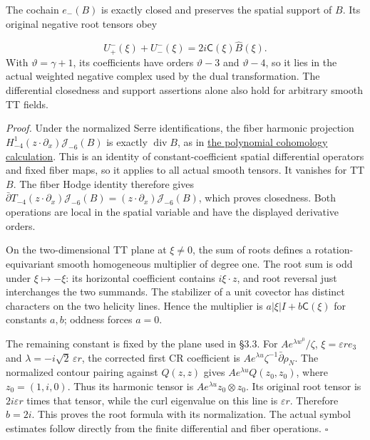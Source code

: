 \documentclass[
  english,
  11pt,
  reqno]{amsart}
\begin{document}
The cochain \(e_-(B)\) is exactly closed and preserves the spatial
support of \(B\). Its original negative root tensors obey

\label{eq:online-negative-harmonic-exact-root-map} \[
U^-_+(\xi)+U^-_-(\xi)=2i\mathsf C(\xi)\widehat B(\xi).
\] With \(\vartheta=\gamma+1\), its coefficients have orders
\(\vartheta-3\) and \(\vartheta-4\), so it lies in the actual weighted
negative complex used by the dual transformation. The differential
closedness and support assertions alone also hold for arbitrary smooth
TT fields.

\emph{Proof.} Under the normalized Serre identifications, the fiber
harmonic projection \(H_{-4}^1(z\cdot\partial_x)\mathscr J_{-6}(B)\) is
exactly \(\operatorname{div}B\), as in
\hyperref[prop:online-polynomial-cr-cohomology]{the polynomial
cohomology calculation}. This is an identity of constant-coefficient
spatial differential operators and fixed fiber maps, so it applies to
all actual smooth tensors. It vanishes for TT \(B\). The fiber Hodge
identity therefore gives
\(\bar\partial T_{-4}(z\cdot\partial_x)\mathscr J_{-6}(B)
 =(z\cdot\partial_x)\mathscr J_{-6}(B)\), which proves closedness. Both
operations are local in the spatial variable and have the displayed
derivative orders.

On the two-dimensional TT plane at \(\xi\ne0\), the sum of roots defines
a rotation-equivariant smooth homogeneous multiplier of degree one. The
root sum is odd under \(\xi\mapsto-\xi\): its horizontal coefficient
contains \(i\xi\cdot z\), and root reversal just interchanges the two
summands. The stabilizer of a unit covector has distinct characters on
the two helicity lines. Hence the multiplier is
\(a|\xi|I+b\mathsf C(\xi)\) for constants \(a,b\); oddness forces
\(a=0\).

The remaining constant is fixed by the plane used in §3.3. For
\(Ae^{\lambda w^0}/\zeta\), \(\xi=\varepsilon r e_3\) and
\(\lambda=-i\sqrt2\,\varepsilon r\), the corrected first CR coefficient
is \(Ae^{\lambda u}\zeta^{-1}\bar\partial\rho_N\). The normalized
contour pairing against \(Q(z,z)\) gives \(Ae^{\lambda u}Q(z_0,z_0)\),
where \(z_0=(1,i,0)\). Thus its harmonic tensor is
\(Ae^{\lambda u}z_0\otimes z_0\). Its original root tensor is
\(2i\varepsilon r\) times that tensor, while the curl eigenvalue on this
line is \(\varepsilon r\). Therefore \(b=2i\). This proves the root
formula with its normalization. The actual symbol estimates follow
directly from the finite differential and fiber operations.
\hfill\(\square\)
\end{document}
